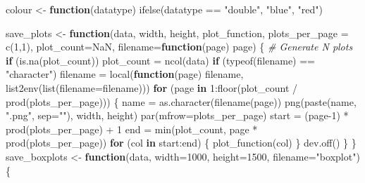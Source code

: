 \documentclass[
]{article}
\newenvironment{Shaded}{\begin{snugshade}}{\end{snugshade}}
\newcommand{\AttributeTok}[1]{\textcolor[rgb]{0.77,0.63,0.00}{#1}}
\newcommand{\CommentTok}[1]{\textcolor[rgb]{0.56,0.35,0.01}{\textit{#1}}}
\newcommand{\ConstantTok}[1]{\textcolor[rgb]{0.00,0.00,0.00}{#1}}
\newcommand{\ControlFlowTok}[1]{\textcolor[rgb]{0.13,0.29,0.53}{\textbf{#1}}}
\newcommand{\DecValTok}[1]{\textcolor[rgb]{0.00,0.00,0.81}{#1}}
\newcommand{\FunctionTok}[1]{\textcolor[rgb]{0.00,0.00,0.00}{#1}}
\newcommand{\NormalTok}[1]{#1}
\newcommand{\OtherTok}[1]{\textcolor[rgb]{0.56,0.35,0.01}{#1}}
\newcommand{\SpecialCharTok}[1]{\textcolor[rgb]{0.00,0.00,0.00}{#1}}
\newcommand{\StringTok}[1]{\textcolor[rgb]{0.31,0.60,0.02}{#1}}
\begin{document}
\begin{Shaded}
\begin{Highlighting}[]
\NormalTok{colour }\OtherTok{\textless{}{-}} \ControlFlowTok{function}\NormalTok{(datatype) }\FunctionTok{ifelse}\NormalTok{(datatype }\SpecialCharTok{==} \StringTok{"double"}\NormalTok{, }\StringTok{"blue"}\NormalTok{, }\StringTok{"red"}\NormalTok{)}

\NormalTok{save\_plots }\OtherTok{\textless{}{-}} \ControlFlowTok{function}\NormalTok{(data, width, height, plot\_function, }\AttributeTok{plots\_per\_page =} \FunctionTok{c}\NormalTok{(}\DecValTok{1}\NormalTok{,}\DecValTok{1}\NormalTok{),}
\AttributeTok{    plot\_count=}\ConstantTok{NaN}\NormalTok{, }\AttributeTok{filename=}\ControlFlowTok{function}\NormalTok{(page) page) \{}
    \CommentTok{\#\textquotesingle{} Generate N plots}
    \ControlFlowTok{if}\NormalTok{ (}\FunctionTok{is.na}\NormalTok{(plot\_count)) plot\_count }\OtherTok{=} \FunctionTok{ncol}\NormalTok{(data)}
    \ControlFlowTok{if}\NormalTok{ (}\FunctionTok{typeof}\NormalTok{(filename) }\SpecialCharTok{==} \StringTok{"character"}\NormalTok{)}
    \NormalTok{    filename }\OtherTok{=} \FunctionTok{local}\NormalTok{(}\ControlFlowTok{function}\NormalTok{(page) filename, }\FunctionTok{list2env}\NormalTok{(}\FunctionTok{list}\NormalTok{(}\AttributeTok{filename=}\NormalTok{filename)))}
    \ControlFlowTok{for}\NormalTok{ (page }\ControlFlowTok{in} \DecValTok{1}\SpecialCharTok{:}\FunctionTok{floor}\NormalTok{(plot\_count }\SpecialCharTok{/} \FunctionTok{prod}\NormalTok{(plots\_per\_page))) \{}
\NormalTok{            name }\OtherTok{=} \FunctionTok{as.character}\NormalTok{(}\FunctionTok{filename}\NormalTok{(page))}
        \FunctionTok{png}\NormalTok{(}\FunctionTok{paste}\NormalTok{(name, }\StringTok{".png"}\NormalTok{, }\AttributeTok{sep=}\StringTok{""}\NormalTok{), width, height)}
        \FunctionTok{par}\NormalTok{(}\AttributeTok{mfrow=}\NormalTok{plots\_per\_page)}
\NormalTok{        start }\OtherTok{=}\NormalTok{ (page}\DecValTok{{-}1}\NormalTok{) }\SpecialCharTok{*} \FunctionTok{prod}\NormalTok{(plots\_per\_page) }\SpecialCharTok{+} \DecValTok{1}
\NormalTok{        end }\OtherTok{=} \FunctionTok{min}\NormalTok{(plot\_count, page }\SpecialCharTok{*} \FunctionTok{prod}\NormalTok{(plots\_per\_page))}
        \ControlFlowTok{for}\NormalTok{ (col }\ControlFlowTok{in}\NormalTok{ start}\SpecialCharTok{:}\NormalTok{end) \{}
            \FunctionTok{plot\_function}\NormalTok{(col)}
\NormalTok{        \}}
        \FunctionTok{dev.off}\NormalTok{()}
\NormalTok{    \}}
\NormalTok{\}}
\NormalTok{save\_boxplots }\OtherTok{\textless{}{-}} \ControlFlowTok{function}\NormalTok{(data, }\AttributeTok{width=}\DecValTok{1000}\NormalTok{, }\AttributeTok{height=}\DecValTok{1500}\NormalTok{, }\AttributeTok{filename=}\StringTok{"boxplot"}\NormalTok{) \{}

\end{Highlighting}
\end{Shaded}
\end{document}
